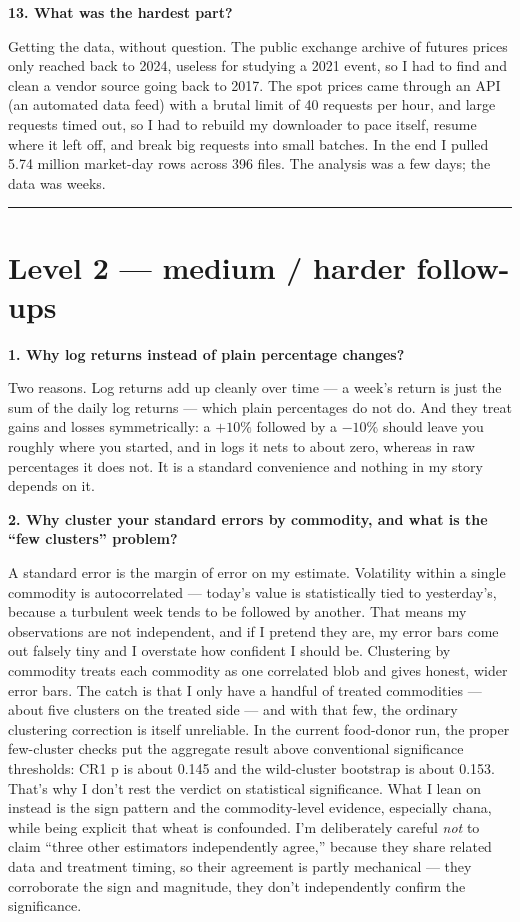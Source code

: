 \documentclass[11pt]{article}
\newcommand{\Q}[1]{\medskip\noindent\textbf{#1}\par}
\newcommand{\A}{\noindent}
\begin{document}
\Q{13. What was the hardest part?}
\A Getting the data, without question. The public exchange archive of futures prices only reached
back to 2024, useless for studying a 2021 event, so I had to find and clean a vendor source going
back to 2017. The spot prices came through an API (an automated data feed) with a brutal limit of 40
requests per hour, and large requests timed out, so I had to rebuild my downloader to pace itself,
resume where it left off, and break big requests into small batches. In the end I pulled 5.74 million
market-day rows across 396 files. The analysis was a few days; the data was weeks.

\bigskip
\hrule

\section{Level 2 --- medium / harder follow-ups}

\Q{1. Why log returns instead of plain percentage changes?}
\A Two reasons. Log returns add up cleanly over time --- a week's return is just the sum of the daily
log returns --- which plain percentages do not do. And they treat gains and losses symmetrically: a
$+10\%$ followed by a $-10\%$ should leave you roughly where you started, and in logs it nets to
about zero, whereas in raw percentages it does not. It is a standard convenience and nothing in my
story depends on it.

\Q{2. Why cluster your standard errors by commodity, and what is the ``few clusters'' problem?}
\A A standard error is the margin of error on my estimate. Volatility within a single commodity is
autocorrelated --- today's value is statistically tied to yesterday's, because a turbulent week tends
to be followed by another. That means my observations are not independent, and if I pretend they are,
my error bars come out falsely tiny and I overstate how confident I should be. Clustering by
commodity treats each commodity as one correlated blob and gives honest, wider error bars. The catch
is that I only have a handful of treated commodities --- about five clusters on the treated side ---
and with that few, the ordinary clustering correction is itself unreliable. In the current food-donor
run, the proper few-cluster checks put the aggregate result above conventional significance
thresholds: CR1 p is about 0.145 and the wild-cluster bootstrap is about 0.153. That's why I don't
rest the verdict on statistical significance. What I lean on instead is the sign pattern and the
commodity-level evidence, especially chana, while being explicit that wheat is confounded. I'm
deliberately careful \emph{not} to claim ``three other estimators independently agree,'' because
they share related data and treatment timing, so their agreement
is partly mechanical --- they corroborate the sign and magnitude, they don't independently confirm
the significance.
\end{document}
